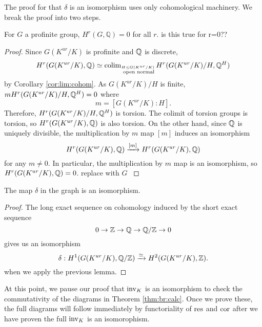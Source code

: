 \documentclass[class=article, crop=false]{standalone}
\begin{document}
The proof for that \(\delta\) is an isomorphism
uses only cohomological machinery.
We break the proof into two steps.

\begin{lemma} \coproof
	For \(G\) a profinite group, 
	\(H^{r}(G,\mathbb{Q}) = 0\) for all \(r\).
	{\color{red} is this true for r=0??}
\end{lemma}

\begin{proof}
	Since $G(K^{ur}/K)$ is profinite and $\mathbb{Q}$ is discrete,
	\[
		H^{r}(G(K^{ur}/K),\mathbb{Q})\simeq\operatorname{colim}_{\stackrel{H\le G(K^{ur}/K)}{\text{ open normal}}}H^{r}(G(K^{ur}/K)/H,\mathbb{Q}^{H})
	\] 
	by Corollary \ref{cor:lim:cohom}.
	As $G(K^{ur}/K)/H$ is finite, $mH^{r}(G(K^{ur}/K)/H,\mathbb{Q}^{H})=0$ where
	\[
	m=[G(K^{ur}/K):H]
	.\] 
	Therefore, $H^{r}(G(K^{ur}/K)/H,\mathbb{Q}^{H})$ is torsion. 
	The colimit of torsion groups is torsion, 
	so $H^{r}(G(K^{ur}/K),\mathbb{Q})$ is also torsion. 
	On the other hand, since $\mathbb{Q}$ is uniquely divisible, the multiplication by $m$ map $[m]$ induces an isomorphism
	\[
		H^{r}(G(K^{ur}/K),\mathbb{Q})\xrightarrow{[m]}H^{r}(G(K^{ur}/K),\mathbb{Q})
	\] 
	for any $m\ne 0$. In particular, the multiplication by 
	\(m\)
	map is an isomorphism, so $H^{r}(G(K^{ur}/K),\mathbb{Q})=0$. 
	{\color{red} replace with \(G\) }
\end{proof}

\begin{proposition} \coproof
	 The map \(\delta\) in the graph is an isomorphism.
\end{proposition}

\begin{proof}
	The long exact sequence on cohomology induced by the short exact sequence
	\[
		0\to\mathbb{Z}\to\mathbb{Q}\to\mathbb{Q}/\mathbb{Z}\to 0
	\] 
	gives us an isomorphism
	\[
		\delta:H^{1}(G(K^{ur}/K),\mathbb{Q}/\mathbb{Z})\xrightarrow{\simeq}H^{2}(G(K^{ur}/K),\mathbb{Z})
	.\] 
	when we apply the previous lemma.
\end{proof}



At this point, we pause our proof that \(\operatorname{inv}_{K}\) is an isomorphism
to check the commutativity of the diagrams in Theorem \ref{thm:br:calc}.
{\color{red} Once we prove these, the full diagrams will 
follow immediately by functoriality of \(\operatorname{res}\) and \(\operatorname{cor}\)
after we have proven the full \(\operatorname{inv}_{K}\) is an isomorophism.}
\end{document}
